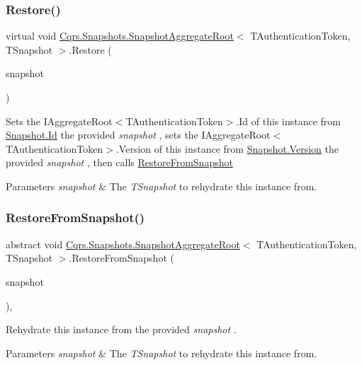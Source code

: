 \subsubsection{\texorpdfstring{Restore()}{Restore()}}
{\footnotesize\ttfamily virtual void \hyperlink{classCqrs_1_1Snapshots_1_1SnapshotAggregateRoot}{Cqrs.\+Snapshots.\+Snapshot\+Aggregate\+Root}$<$ T\+Authentication\+Token, T\+Snapshot $>$.Restore (\begin{DoxyParamCaption}\item[{T\+Snapshot}]{snapshot }\end{DoxyParamCaption})\hspace{0.3cm}{\ttfamily [virtual]}}



Sets the I\+Aggregate\+Root$<$\+T\+Authentication\+Token$>$.\+Id of this instance from \hyperlink{classCqrs_1_1Snapshots_1_1Snapshot_a0da54bdfa43e46a17f6e6aa88d1f3b67_a0da54bdfa43e46a17f6e6aa88d1f3b67}{Snapshot.\+Id} the provided {\itshape snapshot} , sets the I\+Aggregate\+Root$<$\+T\+Authentication\+Token$>$.\+Version of this instance from \hyperlink{classCqrs_1_1Snapshots_1_1Snapshot_a59c0a399430e5f4a1b27d999c3bb5d4f_a59c0a399430e5f4a1b27d999c3bb5d4f}{Snapshot.\+Version} the provided {\itshape snapshot} , then calls \hyperlink{classCqrs_1_1Snapshots_1_1SnapshotAggregateRoot_aefe31de169e33147439a69017a4fd3f7_aefe31de169e33147439a69017a4fd3f7}{Restore\+From\+Snapshot} 


\begin{DoxyParams}{Parameters}
{\em snapshot} & The {\itshape T\+Snapshot}  to rehydrate this instance from.\\
\hline
\end{DoxyParams}
\mbox{\label{classCqrs_1_1Snapshots_1_1SnapshotAggregateRoot_aefe31de169e33147439a69017a4fd3f7_aefe31de169e33147439a69017a4fd3f7}} 
\subsubsection{\texorpdfstring{Restore\+From\+Snapshot()}{RestoreFromSnapshot()}}
{\footnotesize\ttfamily abstract void \hyperlink{classCqrs_1_1Snapshots_1_1SnapshotAggregateRoot}{Cqrs.\+Snapshots.\+Snapshot\+Aggregate\+Root}$<$ T\+Authentication\+Token, T\+Snapshot $>$.Restore\+From\+Snapshot (\begin{DoxyParamCaption}\item[{T\+Snapshot}]{snapshot }\end{DoxyParamCaption})\hspace{0.3cm}{\ttfamily [protected]}, {}}



Rehydrate this instance from the provided {\itshape snapshot} . 


\begin{DoxyParams}{Parameters}
{\em snapshot} & The {\itshape T\+Snapshot}  to rehydrate this instance from.\\
\hline
\end{DoxyParams}
